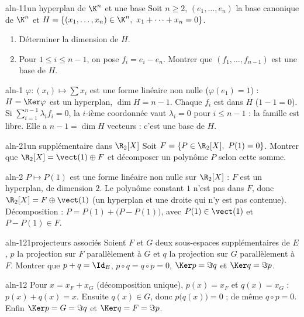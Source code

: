 
\begin{exo}{aln-1}{1}{un hyperplan de $\K^n$ et une base}
Soit $n\geq2$, $(e_1,\dots,e_n)$ la base canonique de $\K^n$ et $H=\{(x_1,\dots,x_n)\in\K^n,\ x_1+\dots+x_n=0\}$.
\begin{enumerate}
\item Déterminer la dimension de $H$.
\item Pour $1\leq i\leq n-1$, on pose $f_i=e_i-e_n$. Montrer que $(f_1,\dots,f_{n-1})$ est une base de $H$.
\end{enumerate}
\end{exo}
\begin{corrige}{aln-1}
 $\varphi:(x_i)\mapsto\sum x_i$ est une forme linéaire non nulle ($\varphi(e_1)=1$) : $H=\Ker\varphi$ est un hyperplan, $\dim H=n-1$.
 Chaque $f_i$ est dans $H$ ($1-1=0$). Si $\sum_{i=1}^{n-1}\lambda_if_i=0$, la $i$-ième coordonnée vaut $\lambda_i=0$ pour $i\leq n-1$ :
la famille est libre. Elle a $n-1=\dim H$ vecteurs : c'est une base de $H$.
\end{corrige}

\begin{exo}{aln-2}{1}{un supplémentaire dans $\R_2[X]$}
Soit $F=\{P\in\R_2[X],\ P(1)=0\}$. Montrer que $\R_2[X]=\vect(1)\oplus F$ et décomposer un polynôme $P$ selon cette somme.
\end{exo}
\begin{corrige}{aln-2}
$P\mapsto P(1)$ est une forme linéaire non nulle sur $\R_2[X]$ : $F$ est un hyperplan, de dimension $2$. Le polynôme constant $1$
n'est pas dans $F$, donc $\R_2[X]=F\oplus\vect(1)$ (un hyperplan et une droite qui n'y est pas contenue). Décomposition :
$P=P(1)+\big(P-P(1)\big)$, avec $P(1)\in\vect(1)$ et $P-P(1)\in F$.
\end{corrige}

\begin{exo}{aln-12}{1}{projecteurs associés}
Soient $F$ et $G$ deux sous-espaces supplémentaires de $E$, $p$ la projection sur $F$ parallèlement à $G$ et $q$ la projection sur
$G$ parallèlement à $F$. Montrer que $p+q=\Id_E$, $p\circ q=q\circ p=0$, $\Ker p=\Im q$ et $\Ker q=\Im p$.
\end{exo}
\begin{corrige}{aln-12}
Pour $x=x_F+x_G$ (décomposition unique), $p(x)=x_F$ et $q(x)=x_G$ : $p(x)+q(x)=x$. Ensuite $q(x)\in G$, donc $p\big(q(x)\big)=0$ ;
de même $q\circ p=0$. Enfin $\Ker p=G=\Im q$ et $\Ker q=F=\Im p$.
\end{corrige}

